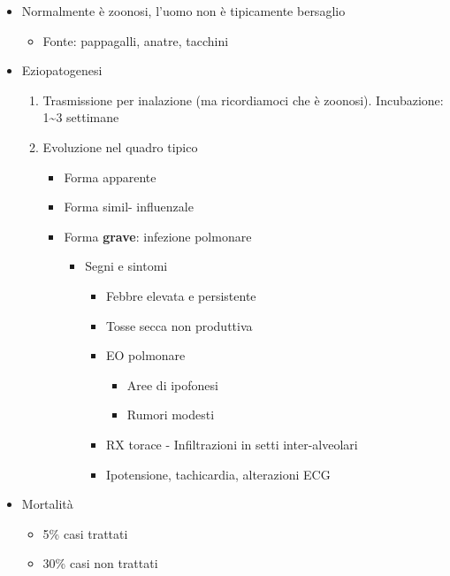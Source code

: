 \documentclass[italian,]{article}
\providecommand{\tightlist}{%
  \setlength{\itemsep}{0pt}\setlength{\parskip}{0pt}}
\begin{document}
\begin{itemize}
\tightlist
\item
  Normalmente è zoonosi, l'uomo non è tipicamente bersaglio

  \begin{itemize}
  \tightlist
  \item
    Fonte: pappagalli, anatre, tacchini
  \end{itemize}
\item
  Eziopatogenesi

  \begin{enumerate}
  \def\labelenumi{\arabic{enumi}.}
  \setcounter{enumi}{-1}
  \tightlist
  \item
    Trasmissione per inalazione (ma ricordiamoci che è zoonosi).
    Incubazione: 1\textasciitilde{}3 settimane
  \item
    Evoluzione nel quadro tipico

    \begin{itemize}
    \tightlist
    \item
      Forma apparente
    \item
      Forma simil- influenzale
    \item
      Forma \textbf{grave}: infezione polmonare

      \begin{itemize}
      \tightlist
      \item
        Segni e sintomi

        \begin{itemize}
        \tightlist
        \item
          Febbre elevata e persistente
        \item
          Tosse secca non produttiva
        \item
          EO polmonare

          \begin{itemize}
          \tightlist
          \item
            Aree di ipofonesi
          \item
            Rumori modesti
          \end{itemize}
        \item
          RX torace - Infiltrazioni in setti inter-alveolari
        \item
          Ipotensione, tachicardia, alterazioni ECG
        \end{itemize}
      \end{itemize}
    \end{itemize}
  \end{enumerate}
\item
  Mortalità

  \begin{itemize}
  \tightlist
  \item
    5\% casi trattati
  \item
    30\% casi non trattati
  \end{itemize}
\end{itemize}
\end{document}
